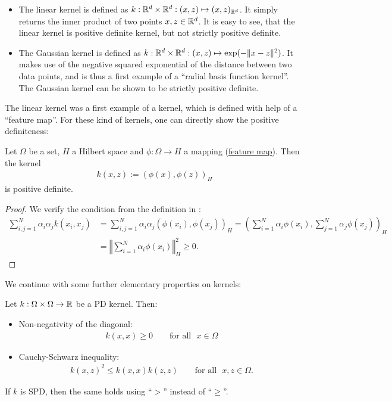 \begin{example}
\label{ex:kernels}
\begin{itemize}
\item The linear kernel is defined as $k: \mathbb{R}^d \times \mathbb{R}^d: (x, z) \mapsto (x, z)_{\mathbb{R}^d}$. 
It simply returns the inner product of two points $x, z \in \mathbb{R}^d$.
It is easy to see, that the linear kernel is positive definite kernel, but not strictly positive definite.
\item The Gaussian kernel is defined as $k: \mathbb{R}^d \times \mathbb{R}^d: (x, z) \mapsto \exp(-\Vert x - z \Vert^2)$.
It makes use of the negative squared exponential of the distance between two data points, and is thus a first example of a ``radial basis function kernel''.
The Gaussian kernel can be shown to be strictly positive definite.
\end{itemize}
\end{example}



The linear kernel was a first example of a kernel, which is defined with help of a ``feature map''.
For these kind of kernels, one can directly show the positive definiteness:

\begin{thm}
\label{th:feature_map_kernel}
Let $\Omega$ be a set, $H$ a Hilbert space and $\phi: \Omega \rightarrow H$ a mapping (\underline{feature map}).
Then the kernel 
\begin{align*}
k(x, z) := (\phi(x), \phi(z))_{H}
\end{align*}
is positive definite.
\end{thm}

\begin{proof}
We verify the condition from the definition in :
\begin{align*}
\sum_{i,j=1}^N \alpha_i \alpha_j k(x_i, x_j) &= \sum_{i, j=1}^N \alpha_i \alpha_j (\phi(x_i), \phi(x_j))_H 
= (\sum_{i=1}^N \alpha_i \phi(x_i), \sum_{j=1}^N \alpha_j \phi(x_j) )_H \\
&= \left \Vert \sum_{i=1}^N \alpha_i \phi(x_i) \right \Vert_H^2 \geq 0.
\end{align*}
\end{proof}



We continue with some further elementary properties on kernels:

\begin{prop}
Let $k: \Omega \times \Omega \rightarrow \mathbb{R}$ be a PD kernel. Then:
\begin{itemize}
\item Non-negativity of the diagonal: 
\begin{align*}
k(x, x) \geq 0 \qquad \text{for all ~} x \in \Omega
\end{align*}
\item Cauchy-Schwarz inequality: 
\begin{align*}
k(x, z)^2 \leq k(x, x)k(z,z) \qquad \text{for all ~} x, z \in \Omega.
\end{align*}
\end{itemize}
If $k$ is SPD, then the same holds using ``$>$'' instead of ``$\geq$''.
\end{prop}

